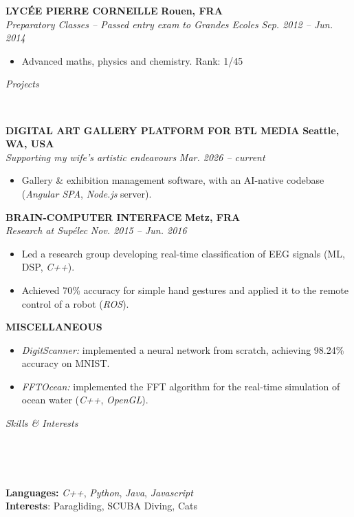\documentclass[a4paper, 12pt]{article}
\newcommand{\marginline}{-0.3cm}
\newcommand{\margincontent}{-0.6cm}
\newcommand{\marginbeforesection}{0.35cm}
\newcommand{\marginbeforemisc}{-0.75cm}
\newcommand{\linewidthperso}{0.02cm}
\newcommand{\styletitle}[1]{\textbf{#1}}
\newcommand{\styledesc}[1]{\textit{#1}}
\newcommand{\styleloc}[1]{\textbf{#1}}
\newcommand{\styledates}[1]{\textit{#1}}
\newcommand{\stylesection}[1]{
  \vspace{\marginbeforesection}
  \begin{normalsize}\textit{#1}\end{normalsize}
  \vspace{\marginline}\\
  \noindent\makebox[\linewidth]{\rule{\textwidth}{\linewidthperso}}

}
\begin{document}
\begin{footnotesize}
\styletitle{LYC\'EE PIERRE CORNEILLE} \hfill \styleloc{Rouen, FRA}\\
\styledesc{Preparatory Classes -- Passed entry exam to Grandes Ecoles} \hfill \styledates{Sep. 2012 -- Jun. 2014}\\
\vspace{\margincontent}
\begin{itemize}
  \item Advanced maths, physics and chemistry. \hfill Rank: 1/45
\end{itemize}

\stylesection{Projects}

\styletitle{DIGITAL ART GALLERY PLATFORM FOR BTL MEDIA} \hfill \styleloc{Seattle, WA, USA}\\
\styledesc{Supporting my wife's artistic endeavours} \hfill \styledates{Mar. 2026 -- current}\\
\vspace{\margincontent}
\begin{itemize}
    \item Gallery \& exhibition management software, with an AI-native codebase (\textit{Angular SPA}, \textit{Node.js} server).
\end{itemize}

\styletitle{BRAIN-COMPUTER INTERFACE} \hfill \styleloc{Metz, FRA}\\
\styledesc{Research at Sup\'elec} \hfill \styledates{Nov. 2015 -- Jun. 2016}\\
\vspace{\margincontent}
\begin{itemize}
  \item Led a research group developing real-time classification of EEG signals (ML, DSP, \textit{C++}).
  \item Achieved 70\% accuracy for simple hand gestures and applied it to the remote control of a robot (\textit{ROS}).
\end{itemize}

\styletitle{MISCELLANEOUS}\\
\vspace{\margincontent}
\begin{itemize}
  \item \textit{DigitScanner:} implemented a neural network from scratch, achieving 98.24\% accuracy on MNIST.
  \item \textit{FFTOcean:} implemented the FFT algorithm for the real-time simulation of ocean water (\textit{C++}, \textit{OpenGL}).
\end{itemize}

\stylesection{Skills \& Interests}
~\\
\vspace{\marginbeforemisc}

\noindent
\textbf{Languages:} \textit{C++}, \textit{Python}, \textit{Java}, \textit{Javascript}\\
\textbf{Interests}: Paragliding, SCUBA Diving, Cats\\

\end{footnotesize}
\end{document}
